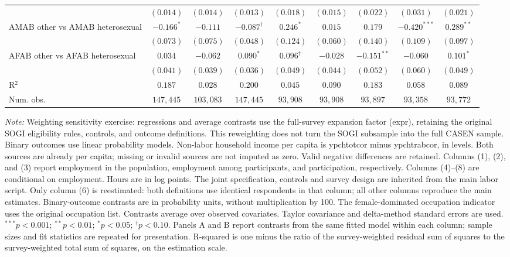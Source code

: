 \begin{table}[htpb!]
{\begin{tabular}{l c c c c c c c c}
 & $(0.014)$ & $(0.014)$ & $(0.013)$ & $(0.018)$ & $(0.015)$ & $(0.022)$ & $(0.031)$ & $(0.021)$ \\
AMAB other vs AMAB heterosexual & $-0.166^{*}$ & $-0.111$ & $-0.087^{\dagger}$ & $0.246^{*}$ & $0.015$ & $0.179$ & $-0.420^{***}$ & $0.289^{**}$ \\
 & $(0.073)$ & $(0.075)$ & $(0.048)$ & $(0.124)$ & $(0.060)$ & $(0.140)$ & $(0.109)$ & $(0.097)$ \\
AFAB other vs AFAB heterosexual & $0.034$ & $-0.062$ & $0.090^{*}$ & $0.096^{\dagger}$ & $-0.028$ & $-0.151^{**}$ & $-0.060$ & $0.101^{*}$ \\
 & $(0.041)$ & $(0.039)$ & $(0.036)$ & $(0.049)$ & $(0.044)$ & $(0.052)$ & $(0.060)$ & $(0.049)$ \\
\hline
R$^2$ & $0.187$ & $0.028$ & $0.200$ & $0.045$ & $0.090$ & $0.183$ & $0.058$ & $0.089$ \\
Num. obs. & $147,445$ & $103,083$ & $147,445$ & $93,908$ & $93,908$ & $93,897$ & $93,358$ & $93,772$ \\
\hline
\end{tabular}%
}
\par\vspace{1ex}
\begin{minipage}{\textwidth}\footnotesize\raggedright
\textit{Note:} Weighting sensitivity exercise: regressions and average contrasts use the full-survey expansion factor (expr), retaining the original SOGI eligibility rules, controls, and outcome definitions. This reweighting does not turn the SOGI subsample into the full CASEN sample. Binary outcomes use linear probability models. Non-labor household income per capita is ypchtotcor minus ypchtrabcor, in levels. Both sources are already per capita; missing or invalid sources are not imputed as zero. Valid negative differences are retained. Columns (1), (2), and (3) report employment in the population, employment among participants, and participation, respectively. Columns (4)--(8) are conditional on employment. Hours are in log points. The joint specification, controls and survey design are inherited from the main labor script. Only column (6) is reestimated: both definitions use identical respondents in that column; all other columns reproduce the main estimates. Binary-outcome contrasts are in probability units, without multiplication by 100. The female-dominated occupation indicator uses the original occupation list. Contrasts average over observed covariates. Taylor covariance and delta-method standard errors are used. $^{***}p<0.001$; $^{**}p<0.01$; $^{*}p<0.05$; $^{\dagger}p<0.10$. Panels A and B report contrasts from the same fitted model within each column; sample sizes and fit statistics are repeated for presentation. R-squared is one minus the ratio of the survey-weighted residual sum of squares to the survey-weighted total sum of squares, on the estimation scale.
\end{minipage}
\end{table}
